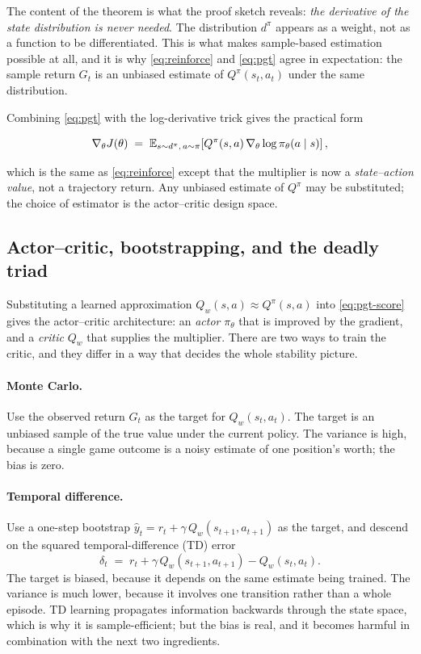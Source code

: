 The content of the theorem is what the proof sketch reveals: \emph{the
derivative of the state distribution is never needed}. The distribution
$d^\pi$ appears as a weight, not as a function to be differentiated. This is
what makes sample-based estimation possible at all, and it is why
\eqref{eq:reinforce} and \eqref{eq:pgt} agree in expectation: the sample return
$G_t$ is an unbiased estimate of $Q^\pi(s_t,a_t)$ under the same distribution.

Combining \eqref{eq:pgt} with the log-derivative trick gives the practical form

\begin{equation}
\nabla_\theta J(\theta) \;=\;
\mathbb{E}_{s \sim d^\pi,\, a \sim \pi}\!\left[ Q^{\pi}(s,a)\, \nabla_\theta
\log \pi_\theta(a \mid s) \right],
\label{eq:pgt-score}
\end{equation}

which is the same as \eqref{eq:reinforce} except that the multiplier is now a
\emph{state--action value}, not a trajectory return. Any unbiased estimate of
$Q^\pi$ may be substituted; the choice of estimator is the actor--critic design
space.

\subsection{Actor--critic, bootstrapping, and the deadly triad}
\label{sec:actorcritic}

Substituting a learned approximation $Q_w(s,a) \approx Q^\pi(s,a)$ into
\eqref{eq:pgt-score} gives the actor--critic architecture: an \emph{actor}
$\pi_\theta$ that is improved by the gradient, and a \emph{critic} $Q_w$ that
supplies the multiplier. There are two ways to train the critic, and they
differ in a way that decides the whole stability picture.

\paragraph{Monte Carlo.} Use the observed return $G_t$ as the target for
$Q_w(s_t,a_t)$. The target is an unbiased sample of the true value under the
current policy. The variance is high, because a single game outcome is a noisy
estimate of one position's worth; the bias is zero.

\paragraph{Temporal difference.} Use a one-step bootstrap
$\hat{y}_t = r_t + \gamma\, Q_w(s_{t+1}, a_{t+1})$ as the target, and descend on
the squared temporal-difference (TD) error
\begin{equation}
\delta_t \;=\; r_t + \gamma\, Q_w(s_{t+1},a_{t+1}) - Q_w(s_t,a_t).
\label{eq:td}
\end{equation}
The target is biased, because it depends on the same estimate being trained.
The variance is much lower, because it involves one transition rather than a
whole episode. TD learning propagates information backwards through the state
space, which is why it is sample-efficient; but the bias is real, and it becomes
harmful in combination with the next two ingredients.

